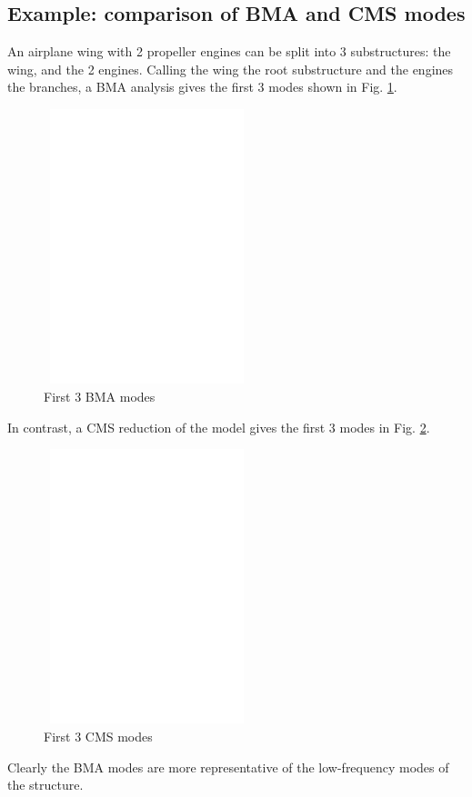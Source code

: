 \documentclass[11pt,openany,twoside]{book}
\numberwithin{equation}{section}		%
\newcommand{\Figref}[1]{Fig. \ref{#1}}  %
\begin{document}
\subsection{Example: comparison of BMA and CMS modes}
An airplane wing with 2 propeller engines can be split into 3 substructures:
the wing, and the 2 engines. Calling the wing the root substructure and the engines
the branches, a BMA analysis gives the first 3 modes shown in \Figref{fig:bma-modes}.
\begin{figure}
	\centering
	\includegraphics[height=8.0cm,width=6.0cm]{bma_modes.eps}
	\caption{First 3 BMA modes}\label{fig:bma-modes}
\end{figure}
In contrast, a CMS reduction of the model gives the first 3 modes in \Figref{fig:cms-modes}.
\begin{figure}
	\centering
	\includegraphics[height=8.0cm,width=6.0cm]{cms_modes.eps}
	\caption{First 3 CMS modes}\label{fig:cms-modes}
\end{figure}
Clearly the BMA modes are more representative of the low-frequency modes of the
structure.
\end{document}

